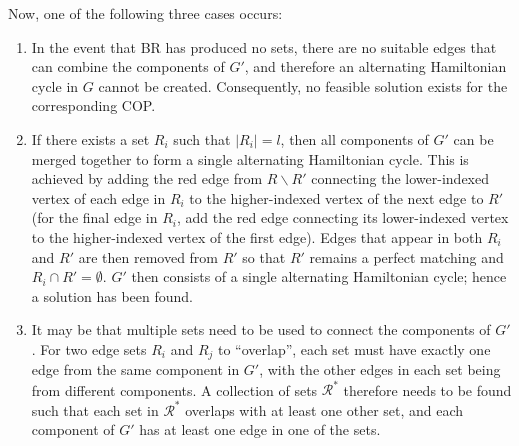 \documentclass[runningheads]{llncs}
\begin{document}
Now, one of the following three cases occurs:
\begin{enumerate}
\item In the event that BR has produced no sets, there are no suitable edges that can combine the components of $G'$, and therefore an alternating Hamiltonian cycle in $G$ cannot be created. Consequently, no feasible solution exists for the corresponding COP.

\item If there exists a set $R_i$ such that $|R_i| = l$, then all components of $G'$ can be merged together to form a single alternating Hamiltonian cycle. This is achieved by adding the red edge from $R\backslash R'$ connecting the lower-indexed vertex of each edge in $R_i$ to the higher-indexed vertex of the next edge to $R'$ (for the final edge in $R_i$, add the red edge connecting its lower-indexed vertex to the higher-indexed vertex of the first edge). Edges that appear in both $R_i$ and $R'$ are then removed from $R'$ so that $R'$ remains a perfect matching and $R_i \cap R' = \emptyset$. $G'$ then consists of a single alternating Hamiltonian cycle; hence a solution has been found.

\item It may be that multiple sets need to be used to connect the components of $G'$. For two edge sets $R_i$ and $R_j$ to ``overlap'', each set must have exactly one edge from the same component in $G'$, with the other edges in each set being from different components. A collection of sets $\mathcal{R}^{*}$ therefore needs to be found such that each set in $\mathcal{R}^*$ overlaps with at least one other set, and each component of $G'$ has at least one edge in one of the sets.
\end{enumerate}
\end{document}
